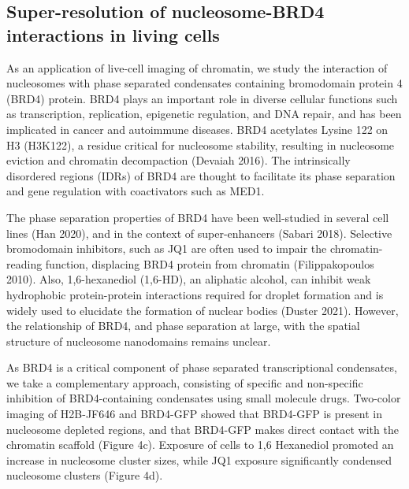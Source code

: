 \documentclass{ucetd}
\begin{document}

\subsection{Super-resolution of nucleosome-BRD4 interactions in living cells}

As an application of live-cell imaging of chromatin, we study the interaction of nucleosomes with phase separated condensates containing bromodomain protein 4 (BRD4) protein. BRD4 plays an important role in diverse cellular functions such as transcription, replication, epigenetic regulation, and DNA repair, and has been implicated in cancer and autoimmune diseases. BRD4 acetylates Lysine 122 on H3 (H3K122), a residue critical for nucleosome stability, resulting in nucleosome eviction and chromatin decompaction (Devaiah 2016). The intrinsically disordered regions (IDRs) of BRD4 are thought to facilitate its phase separation and gene regulation with coactivators such as MED1. 

The phase separation properties of BRD4 have been well-studied in several cell lines (Han 2020), and in the context of super-enhancers (Sabari 2018). Selective bromodomain inhibitors, such as JQ1 are often used to impair the chromatin-reading function, displacing BRD4 protein from chromatin (Filippakopoulos 2010). Also, 1,6-hexanediol (1,6-HD), an aliphatic alcohol, can inhibit weak hydrophobic protein-protein interactions required for droplet formation and is widely used to elucidate the formation of nuclear bodies (Duster 2021). However, the relationship of BRD4, and phase separation at large, with the spatial structure of nucleosome nanodomains remains unclear. 

As BRD4 is a critical component of phase separated transcriptional condensates, we take a complementary approach, consisting of specific and non-specific inhibition of BRD4-containing condensates using small molecule drugs. Two-color imaging of H2B-JF646 and BRD4-GFP showed that BRD4-GFP is present in nucleosome depleted regions, and that BRD4-GFP makes direct contact with the chromatin scaffold (Figure 4c). Exposure of cells to 1,6 Hexanediol promoted an increase in nucleosome cluster sizes, while JQ1 exposure significantly condensed nucleosome clusters (Figure 4d).
\end{document}
